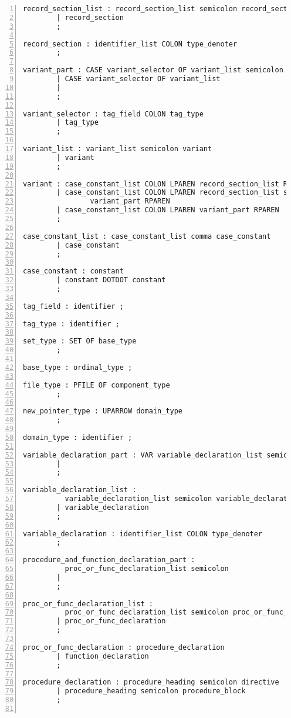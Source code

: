 \begin{Verbatim}[numbers=left]
record_section_list : record_section_list semicolon record_section
        | record_section
        ;

record_section : identifier_list COLON type_denoter
        ;

variant_part : CASE variant_selector OF variant_list semicolon
        | CASE variant_selector OF variant_list
        |
        ;

variant_selector : tag_field COLON tag_type
        | tag_type
        ;

variant_list : variant_list semicolon variant
        | variant
        ;

variant : case_constant_list COLON LPAREN record_section_list RPAREN
        | case_constant_list COLON LPAREN record_section_list semicolon
                variant_part RPAREN
        | case_constant_list COLON LPAREN variant_part RPAREN
        ;

case_constant_list : case_constant_list comma case_constant
        | case_constant
        ;

case_constant : constant
        | constant DOTDOT constant
        ;

tag_field : identifier ;

tag_type : identifier ;

set_type : SET OF base_type
        ;

base_type : ordinal_type ;

file_type : PFILE OF component_type
        ;

new_pointer_type : UPARROW domain_type
        ;

domain_type : identifier ;

variable_declaration_part : VAR variable_declaration_list semicolon
        |
        ;

variable_declaration_list :
          variable_declaration_list semicolon variable_declaration
        | variable_declaration
        ;

variable_declaration : identifier_list COLON type_denoter
        ;

procedure_and_function_declaration_part :
          proc_or_func_declaration_list semicolon
        |
        ;

proc_or_func_declaration_list :
          proc_or_func_declaration_list semicolon proc_or_func_declaration
        | proc_or_func_declaration
        ;

proc_or_func_declaration : procedure_declaration
        | function_declaration
        ;

procedure_declaration : procedure_heading semicolon directive
        | procedure_heading semicolon procedure_block
        ;


\end{Verbatim}
